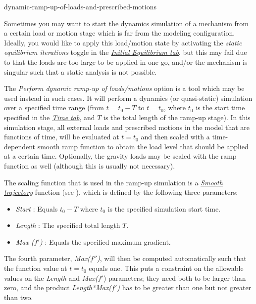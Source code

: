 {
           {dynamic-ramp-up-of-loads-and-prescribed-motions}

Sometimes you may want to start the dynamics simulation of a mechanism from a
certain load or motion stage which is far from the modeling configuration.
Ideally, you would like to apply this load/motion state by activating the
{\sl static equilibrium iterations} toggle in the
\protect\hyperlink{initial-equilibrium-tab}{\sl Initial Equilibrium tab},
but this may fail due to that the loads are too large to be applied in one go,
and/or the mechanism is singular such that a static analysis is not possible.

The {\sl Perform dynamic ramp-up of loads/motions} option is a tool which may be
used instead in such cases. It will perform a dynamics (or quasi-static)
simulation over a specified time range (from $t=t_0-T$ to $t=t_0$, where $t_0$ is
the start time specified in the \protect\hyperlink{time-tab}{\sl Time tab},
and $T$ is the total length of the ramp-up stage).
In this simulation stage, all external loads and prescribed motions in the model
that are functions of time, will be evaluated at $t=t_0$ and then scaled with
a time-dependent smooth ramp function to obtain the load level that should be
applied at a certain time. Optionally, the gravity loads may be scaled with the
ramp function as well (although this is usually not necessary).

The scaling function that is used in the ramp-up simulation is a
\protect\hyperlink{smooth-trajectory}{\sl Smooth trajectory} function
(see ),
which is defined by the following three parameters:

\begin{itemize}
\item{\sl Start} :
  Equals $t_0-T$ where $t_0$ is the specified simulation start time.
\item{\sl Length} :
  The specified total length $T$.
\item{\sl Max ($f'$)} :
  Equals the specified maximum gradient.
\end{itemize}

The fourth parameter, {\sl Max($f''$)}, will then be computed automatically such
that the function value at $t=t_0$ equals one. This puts a constraint on the
allowable values on the {\sl Length} and {\sl Max($f'$}) parameters;
they need both to be larger than zero, and the product
{\sl Length*Max($f'$)} has to be greater than one but not greater than two.

}
